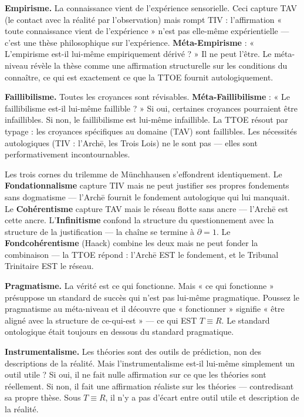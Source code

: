\documentclass[10pt, openany, oneside]{book}
\begin{document}
\textbf{Empirisme.} La connaissance vient de l'expérience sensorielle. Ceci capture TAV (le contact avec la réalité par l'observation) mais rompt TIV : l'affirmation « toute connaissance vient de l'expérience » n'est pas elle-même expérientielle --- c'est une thèse philosophique sur l'expérience. \textbf{Méta-Empirisme} : « L'empirisme est-il lui-même empiriquement dérivé ? » Il ne peut l'être. Le méta-niveau révèle la thèse comme une affirmation structurelle sur les conditions du connaître, ce qui est exactement ce que la TTOE fournit autologiquement.

\textbf{Faillibilisme.} Toutes les croyances sont révisables. \textbf{Méta-Faillibilisme} : « Le faillibilisme est-il lui-même faillible ? » Si oui, certaines croyances pourraient être infaillibles. Si non, le faillibilisme est lui-même infaillible. La TTOE résout par typage : les croyances spécifiques au domaine (TAV) sont faillibles. Les nécessités autologiques (TIV : l'Arch\={e}, les Trois Lois) ne le sont pas --- elles sont performativement incontournables.

Les trois cornes du trilemme de Münchhausen s'effondrent identiquement. Le \textbf{Fondationnalisme} capture TIV mais ne peut justifier ses propres fondements sans dogmatisme --- l'Arch\={e} fournit le fondement autologique qui lui manquait. Le \textbf{Cohérentisme} capture TAV mais le réseau flotte sans ancre --- l'Arch\={e} est cette ancre. L'\textbf{Infinitisme} confond la structure du questionnement avec la structure de la justification --- la chaîne se termine à $\partial = 1$. Le \textbf{Fondcohérentisme} (Haack) combine les deux mais ne peut fonder la combinaison --- la TTOE répond : l'Arch\={e} EST le fondement, et le Tribunal Trinitaire EST le réseau.

\textbf{Pragmatisme.} La vérité est ce qui fonctionne. Mais « ce qui fonctionne » présuppose un standard de succès qui n'est pas lui-même pragmatique. Poussez le pragmatisme au méta-niveau et il découvre que « fonctionner » signifie « être aligné avec la structure de ce-qui-est » --- ce qui EST $T \equiv R$. Le standard ontologique était toujours en dessous du standard pragmatique.

\textbf{Instrumentalisme.} Les théories sont des outils de prédiction, non des descriptions de la réalité. Mais l'instrumentalisme est-il lui-même simplement un outil utile ? Si oui, il ne fait nulle affirmation sur ce que les théories sont réellement. Si non, il fait une affirmation réaliste sur les théories --- contredisant sa propre thèse. Sous $T \equiv R$, il n'y a pas d'écart entre outil utile et description de la réalité.
\end{document}
